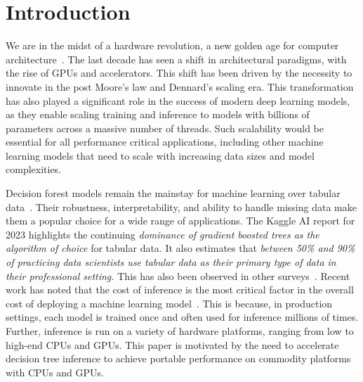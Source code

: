 \section{Introduction}
\label{sec:intro}
We are in the midst of a hardware revolution, a new golden age for computer architecture~\cite{GoldenAge}. The last 
decade has seen a shift in architectural paradigms, with the rise of GPUs and accelerators. This shift has been driven
by the necessity to innovate in the post Moore's law and Dennard's scaling era. This transformation has also played 
a significant role in the success of modern deep learning models, as they enable scaling 
training and inference to models with billions of parameters across a massive number of threads. 
Such scalability would be essential for all performance critical applications, including
other machine learning models that need to scale with increasing data sizes and model complexities. 

Decision forest models remain the mainstay for machine learning over tabular data~\cite{DLNotAllYouNeed,TreebasedOutperformDL}. 
Their robustness, interpretability, and ability to handle missing data make them a popular choice for a wide 
range of applications\cite{DecisionTreesOverview, Med1, Med2, Facebook, LHCModel, Finance}. 
The Kaggle AI report for 2023 \cite{ABCD} highlights the continuing \emph{dominance of 
gradient boosted trees as the algorithm of choice} for tabular data. It also estimates that \emph{between
50\% and 90\% of practicing data scientists use tabular data as their primary type of data in their professional setting.}
This has also been observed in other surveys~\cite{KaggleSurvey,LookingGlass}.
Recent work has noted that the cost of inference is the most critical factor in the overall cost of 
deploying a machine learning model~\cite{Hummingbird, SageMaker}.
This is because, in production settings, each model is trained once and often used for inference millions of times. 
Further, inference is run on a variety of hardware platforms, ranging from low to high-end CPUs and GPUs. 
This paper is motivated by the need to accelerate decision tree inference to achieve portable performance on 
commodity platforms with CPUs and GPUs. 

